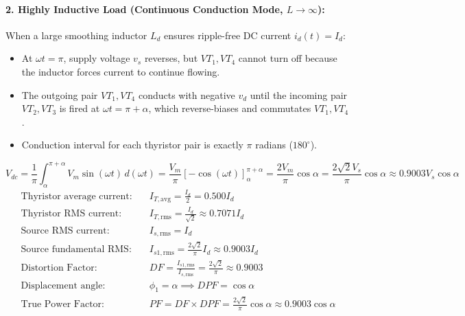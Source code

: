 \paragraph{2. Highly Inductive Load (Continuous Conduction Mode, $L \to \infty$):}
When a large smoothing inductor $L_d$ ensures ripple-free DC current $i_d(t) = I_d$:
\begin{itemize}
  \item At $\omega t = \pi$, supply voltage $v_s$ reverses, but $VT_1, VT_4$ cannot turn off because the inductor forces current to continue flowing.
  \item The outgoing pair $VT_1, VT_4$ conducts with negative $v_d$ until the incoming pair $VT_2, VT_3$ is fired at $\omega t = \pi + \alpha$, which reverse-biases and commutates $VT_1, VT_4$.
  \item Conduction interval for each thyristor pair is exactly $\pi$ radians ($180^\circ$).
\end{itemize}
\begin{equation}
V_{dc} = \frac{1}{\pi}\int_\alpha^{\pi+\alpha} V_m \sin(\omega t)\,d(\omega t) = \frac{V_m}{\pi}\left[-\cos(\omega t)\right]_\alpha^{\pi+\alpha} = \frac{2 V_m}{\pi}\cos\alpha = \frac{2\sqrt{2} V_s}{\pi}\cos\alpha \approx 0.9003 V_s \cos\alpha
\end{equation}
\begin{align}
\text{Thyristor average current:} \quad & I_{T,\mathrm{avg}} = \frac{I_d}{2} = 0.500 I_d \\
\text{Thyristor RMS current:} \quad & I_{T,\mathrm{rms}} = \frac{I_d}{\sqrt{2}} \approx 0.7071 I_d \\
\text{Source RMS current:} \quad & I_{s,\mathrm{rms}} = I_d \\
\text{Source fundamental RMS:} \quad & I_{s1,\mathrm{rms}} = \frac{2\sqrt{2}}{\pi} I_d \approx 0.9003 I_d \\
\text{Distortion Factor:} \quad & DF = \frac{I_{s1,\mathrm{rms}}}{I_{s,\mathrm{rms}}} = \frac{2\sqrt{2}}{\pi} \approx 0.9003 \\
\text{Displacement angle:} \quad & \phi_1 = \alpha \implies DPF = \cos\alpha \\
\text{True Power Factor:} \quad & PF = DF \times DPF = \frac{2\sqrt{2}}{\pi}\cos\alpha \approx 0.9003 \cos\alpha
\end{align}

